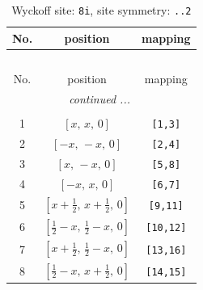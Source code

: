 \documentclass[fleqn,8pt]{jsarticle}
\begin{document}
\renewcommand{\arraystretch}{1.2}
\begin{longtable}{ccc}
\caption{Wyckoff site: {\tt 8i}, site symmetry: {\tt ..2}}
 \\
 \hline \hline
No. & position & mapping \\ \hline \endfirsthead

\multicolumn{2}{l}{\tablename\ \thetable{}} \\
 \hline \hline
No. & position & mapping \\ \hline \endhead

 \hline \hline
\multicolumn{2}{r}{\footnotesize\it continued ...} \\ \endfoot

 \hline \hline
\multicolumn{2}{r}{} \\ \endlastfoot

1 & $\left[ x,\, x,\, 0 \right]$ & {\tt [1,3]} \\ \hline
2 & $\left[ - x,\, - x,\, 0 \right]$ & {\tt [2,4]} \\ \hline
3 & $\left[ x,\, - x,\, 0 \right]$ & {\tt [5,8]} \\ \hline
4 & $\left[ - x,\, x,\, 0 \right]$ & {\tt [6,7]} \\ \hline
5 & $\left[ x + \frac{1}{2},\, x + \frac{1}{2},\, 0 \right]$ & {\tt [9,11]} \\ \hline
6 & $\left[ \frac{1}{2} - x,\, \frac{1}{2} - x,\, 0 \right]$ & {\tt [10,12]} \\ \hline
7 & $\left[ x + \frac{1}{2},\, \frac{1}{2} - x,\, 0 \right]$ & {\tt [13,16]} \\ \hline
8 & $\left[ \frac{1}{2} - x,\, x + \frac{1}{2},\, 0 \right]$ & {\tt [14,15]} \\
\end{longtable}
\renewcommand{\arraystretch}{1.2}
\end{document}
